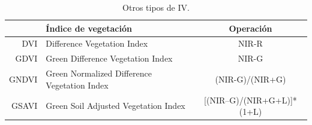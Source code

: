 \begin{table}[ht]
	\centering
	\begin{tabular}{@{}rlc@{}}
	\toprule[0.4mm]
	& Índice de vegetación & Operación\\
	\midrule
	DVI & Difference Vegetation Index & NIR-R\\
	GDVI & Green Difference Vegetation Index & NIR-G\\
	GNDVI & Green Normalized Difference Vegetation Index & (NIR-G)/(NIR+G)\\
	GSAVI & Green Soil Adjusted Vegetation Index & [(NIR–G)/(NIR+G+L)]*(1+L)\\
	\bottomrule[0.4mm]
	\end{tabular}
	\caption[Otros tipos de índices de vegetación]{Otros tipos de \ac{IV}.}
	\label{tab:otros_iv}
\end{table}